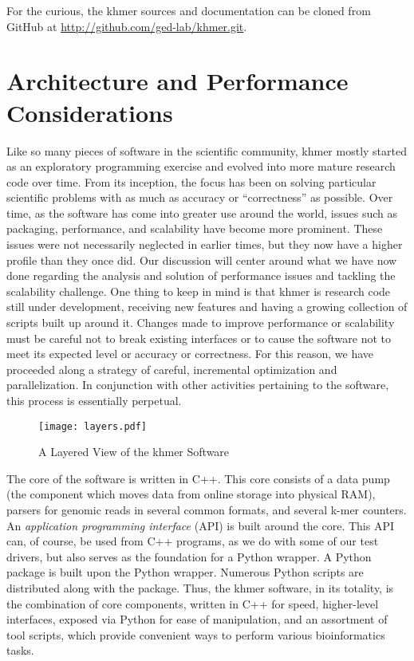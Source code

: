 For the curious, the khmer sources and documentation can be cloned from GitHub
at \url{http://github.com/ged-lab/khmer.git}.

\section{Architecture and Performance Considerations}

Like so many pieces of software in the scientific community, khmer mostly
started as an exploratory programming exercise and evolved into more mature
research code over time. From its inception, the focus has been on solving
particular scientific problems with as much as accuracy or ``correctness'' as
possible. Over time, as the software has come into greater use around the
world, issues such as packaging, performance, and scalability have become more
prominent. These issues were not necessarily neglected in earlier times, but
they now have a higher profile than they once did. Our discussion will center
around what we have now done regarding the analysis and solution of performance
issues and tackling the scalability challenge. One thing to keep in mind is
that khmer is research code still under development, receiving new features and
having a growing collection of scripts built up around it.  Changes made to
improve performance or scalability must be careful not to break existing
interfaces or to cause the software not to meet its expected level or accuracy
or correctness. For this reason, we have proceeded along a strategy of careful,
incremental optimization and parallelization. In conjunction with other
activities pertaining to the software, this process is essentially perpetual.

\begin{figure}[ht!]
\centering
\texttt{[image: layers.pdf]}
\caption{A Layered View of the khmer Software}
\label{khmerLayers}
\end{figure}

The core of the software is written in C++. This core consists of a data pump (the
component which moves data from online storage into physical RAM), parsers for
genomic reads in several common formats, and several k-mer counters. An
\textit{application programming interface} (API) is built around the core. This
API can, of course, be used from C++ programs, as we do with some of our test
drivers, but also serves as the foundation for a Python wrapper. A Python
package is built upon the Python wrapper. Numerous Python scripts are
distributed along with the package. Thus, the khmer software, in its totality,
is the combination of core components, written in C++ for speed, higher-level
interfaces, exposed via Python for ease of manipulation, and an assortment of
tool scripts, which provide convenient ways to perform various bioinformatics
tasks.

